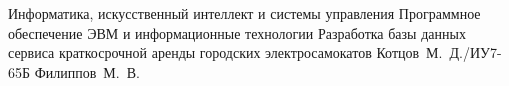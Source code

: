 \documentclass{bmstu}
\begin{document}
\makecourseworktitle
{Информатика, искусственный интеллект и системы управления}
{Программное обеспечение ЭВМ и информационные технологии}
{Разработка базы данных сервиса краткосрочной аренды городских электросамокатов}
{Котцов~М.~Д./ИУ7-65Б}
{Филиппов~М.~В.}
{}

\setcounter{page}{3}



\maketableofcontents








\begin{appendices}
    
    
    
    
\end{appendices}


\end{document}
